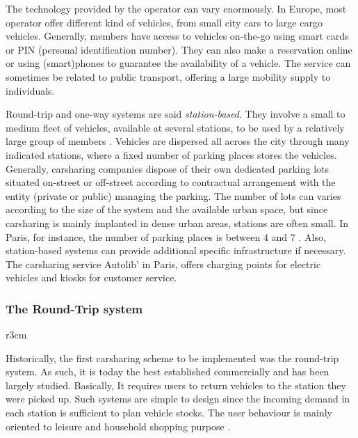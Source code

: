 \begin{bibunit}[ieeetr]
\medskip
The technology provided by the operator can vary enormously.
In Europe, most operator offer different kind of vehicles, from small city cars to large cargo vehicles.
Generally, members have access to vehicles on-the-go using smart cards or PIN (personal identification number).
They can also make a reservation online or using (smart)phones to guarantee the availability of a vehicle.
The service can sometimes be related to public transport, offering a large mobility supply to individuals.

\medskip
Round-trip and one-way systems are said \textit{station-based}.
They involve a small to medium fleet of vehicles, available at several stations, to be used by a relatively large group of members \cite{shaheen_short_1999}.
Vehicles are dispersed all across the city through many indicated stations, where a fixed number of parking places stores the vehicles.
Generally, carsharing companies dispose of their own dedicated parking lots situated on-street or off-street according to contractual arrangement with the entity (private or public) managing the parking.
The number of lots can varies according to the size of the system and the available urban space, but since carsharing is mainly implanted in dense urban areas, stations are often small.
In Paris, for instance, the number of parking places is between $4$ and $7$ \cite{autolib_rapport_2014}.
Also, station-based systems can provide additional specific infrastructure if necessary.
The carsharing service Autolib' in Paris, offers charging points for electric vehicles and kiosks for customer service.


\subsubsection{The Round-Trip system}
\begin{wrapfigure}[6]{r}{3cm}
\vspace{-.4cm}
\end{wrapfigure}
Historically, the first carsharing scheme to be implemented was the round-trip system.
As such, it is today the best established commercially and has been largely studied.
Basically, It requires users to return vehicles to the station they were picked up.
Such systems are simple to design since the incoming demand in each station is sufficient to plan vehicle stocks.
The user behaviour is mainly oriented to leisure and household shopping purpose \cite{barth_shared_use_2002, costain_synopsis_2012}.



\end{bibunit}
